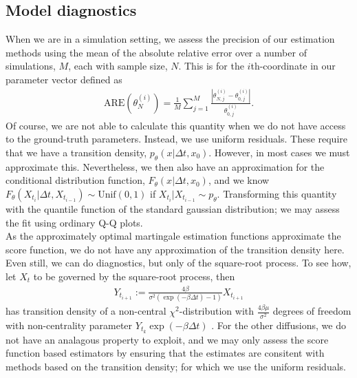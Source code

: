 \subsection{Model diagnostics}
When we are in a simulation setting, we assess the precision of our estimation methods using the mean of the absolute relative error over a number of simulations, $M$, each with sample size, $N$. This is for the $i$th-coordinate in our parameter vector defined as
\begin{align}
    \mathrm{ARE}\left(\theta_N^{(i)}\right) = \frac{1}{M}\sum_{j = 1}^M\frac{\left|\theta_{N,j}^{(i)} - \theta_{0,j}^{(i)}\right|}{\theta_{0,j}^{(i)}}.
\end{align}
Of course, we are not able to calculate this quantity when we do not have access to the ground-truth parameters. Instead, we use uniform residuals. These require that we have a transition density, $p_\theta(x|\Delta t, x_0)$. However, in most cases we must approximate this. Nevertheless, we then also have an approximation for the conditional distribution function, $F_\theta(x|\Delta t, x_0)$, and we know $F_\theta(X_{t_{i}}|\Delta t, X_{t_{i - 1}})\sim \mathrm{Unif}(0,1)$ if $X_{t_{i}}|X_{t_{i - 1}} \sim p_\theta$. Transforming this quantity with the quantile function of the standard gaussian distribution; we may assess the fit using ordinary Q-Q plots.\\
As the approximately optimal martingale estimation functions approximate the score function, we do not have any approximation of the transition density here. Even still, we can do diagnostics, but only of the square-root process. To see how, let $X_t$ to be governed by the square-root process, then
\begin{align}
    Y_{t_{i + 1}} := \frac{4\beta}{\sigma^2\left(\exp\left(-\beta \Delta t\right) - 1\right)}X_{t_{i + 1}}
\end{align}
has transition density of a non-central $\chi^2$-distribution with $\frac{4\beta\mu}{\sigma^2}$ degrees of freedom with non-centrality parameter $Y_{t_k}\exp\left(-\beta \Delta t\right)$ \cite[Equation (5.68)]{Srkk2019}. For the other diffusions, we do not have an analagous property to exploit, and we may only assess the score function based estimators by ensuring that the estimates are consitent with methods based on the transition density; for which we use the uniform residuals.